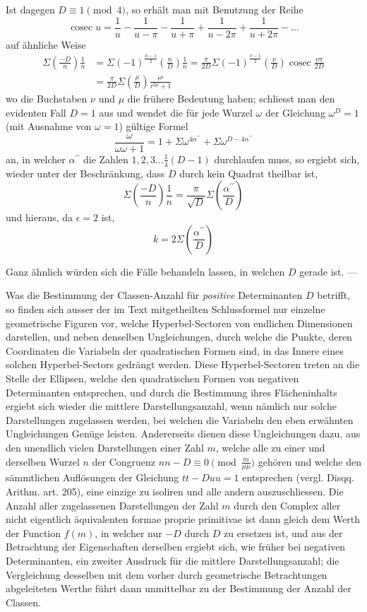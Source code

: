 Ist dagegen $D\equiv1\pmod4$, so erhält man mit Benutzung der Reihe
\[
\operatorname{cosec}u=\frac1u-\frac1{u-\pi}-\frac1{u+\pi}+\frac1{u-2\pi}+\frac1{u+2\pi}-\ldots
\]
auf ähnliche Weise
\[
\begin{aligned}
\Sigma\left(\frac{-D}n\right)\frac1n&=\Sigma(-1)^{\frac{n-1}2}\left(\frac nD\right)\frac1n
=\frac\pi{2D}\Sigma(-1)^{\frac{\nu-1}2}\left(\frac\nu D\right)\operatorname{cosec}\frac{\nu\pi}{2D}\\
&=\frac\pi{2D}\Sigma\left(\frac\mu D\right)\frac{r^\mu}{r^{2\mu}+1}
\end{aligned}
\]
wo die Buchstaben $\nu$ und $\mu$ die frühere Bedeutung haben; schliesst man den evidenten Fall $D=1$ aus und wendet die für jede Wurzel $\omega$ der Gleichung $\omega^D=1$ (mit Ausnahme von $\omega=1$) gültige Formel
\[
\frac\omega{\omega\omega+1}=1+\Sigma\omega^{4\alpha^{\prime\prime}}+\Sigma\omega^{D-4\alpha^{\prime\prime}}
\]
an, in welcher $\alpha^{\prime\prime}$ die Zahlen $1,2,3\ldots\frac14(D-1)$ durchlaufen muss, so ergiebt sich, wieder unter der Beschränkung, dass $D$ durch kein Quadrat theilbar ist,
\[
\Sigma\left(\frac{-D}n\right)\frac1n=\frac\pi{\surd D}\Sigma\left(\frac{\alpha^{\prime\prime}}D\right)
\]
und hieraus, da $\epsilon=2$ ist,
\[
k=2\Sigma\left(\frac{\alpha^{\prime\prime}}D\right)
\]

%
Ganz ähnlich würden sich die Fälle behandeln lassen, in welchen $D$ gerade ist. —

Was die Bestimmung der Classen-Anzahl für \emph{positive} Determinanten $D$ betrifft, so finden sich ausser der im Text mitgetheilten Schlussformel nur einzelne geometrische Figuren vor, welche Hyperbel-Sectoren von endlichen Dimensionen darstellen, und neben denselben Ungleichungen, durch welche die Punkte, deren Coordinaten die Variabeln der quadratischen Formen sind, in das Innere eines solchen Hyperbel-Sectors gedrängt werden. Diese Hyperbel-Sectoren treten an die Stelle der Ellipsen, welche den quadratischen Formen von negativen Determinanten entsprechen, und durch die Bestimmung ihres Flächeninhalts ergiebt sich wieder die mittlere Darstellungsanzahl, wenn nämlich nur solche Darstellungen zugelassen werden, bei welchen die Variabeln den eben erwähnten Ungleichungen Genüge leisten. Andererseits dienen diese Ungleichungen dazu, aus den unendlich vielen Darstellungen einer Zahl $m$, welche alle zu einer und derselben Wurzel $n$ der Congruenz $nn-D\equiv0\pmod{\frac m{\mu\mu}}$ gehören und welche den sämmtlichen Auflösungen der Gleichung $tt-Duu=1$ entsprechen (vergl. Disqq. Arithm. art. 205), eine einzige zu isoliren und alle andern auszuschliessen. Die Anzahl aller zugelassenen Darstellungen der Zahl $m$ durch den Complex aller nicht eigentlich äquivalenten formae proprie primitivae ist dann gleich dem Werth der Function $f(m)$, in welcher nur $-D$ durch $D$ zu ersetzen ist, und aus der Betrachtung der Eigenschaften derselben ergiebt sich, wie früher bei negativen Determinanten, ein zweiter Ausdruck für die mittlere Darstellungsanzahl; die Vergleichung desselben mit dem vorher durch geometrische Betrachtungen abgeleiteten Werthe führt dann unmittelbar zu der Bestimmung der Anzahl der Classen.
\BookRule{35mm}

